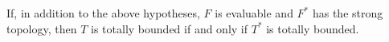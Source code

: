 If, in addition to the above hypotheses, $F$ is evaluable and $F^{*}$ has the strong topology, then $T$ is totally bounded if and only if $T^{*}$ is totally bounded.
